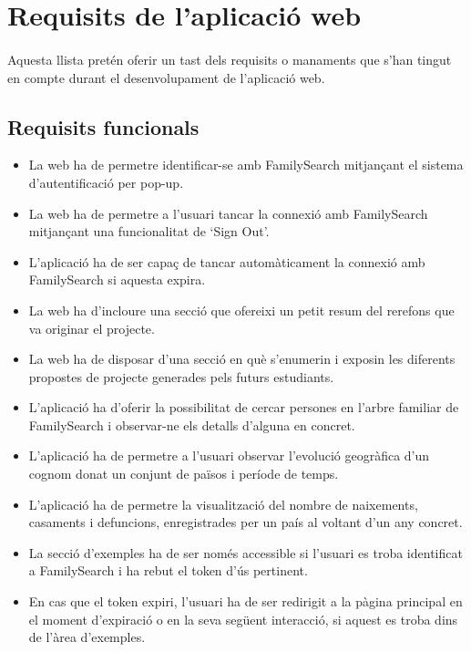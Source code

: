 \section{Requisits de l'aplicació web}

    \paragraph{}
    Aquesta llista pretén oferir un tast dels requisits o manaments que s'han tingut en compte durant el desenvolupament de l'aplicació web.

    \subsection{Requisits funcionals}

    \begin{itemize}
        \item La web ha de permetre identificar-se amb FamilySearch mitjançant el sistema d'autentificació per pop-up.
        \item La web ha de permetre a l'usuari tancar la connexió amb FamilySearch mitjançant una funcionalitat de `Sign Out'.
        \item L'aplicació ha de ser capaç de tancar automàticament la connexió amb Family\-Search si aquesta expira.
        \item La web ha d'incloure una secció que ofereixi un petit resum del rerefons que va originar el projecte.
        \item La web ha de disposar d'una secció en què s'enumerin i exposin les diferents propostes de projecte generades pels futurs estudiants.
        \item L'aplicació ha d'oferir la possibilitat de cercar persones en l'arbre familiar de FamilySearch i observar-ne els detalls d'alguna en concret.
        \item L'aplicació ha de permetre a l'usuari observar l'evolució geogràfica d'un cognom donat un conjunt de països i període de temps.
        \item L'aplicació ha de permetre la visualització del nombre de naixements, casaments i defuncions, enregistrades per un país al voltant d'un any concret.
        \item La secció d'exemples ha de ser només accessible si l'usuari es troba identificat a FamilySearch i ha rebut el token d'ús pertinent.
        \item En cas que el token expiri, l'usuari ha de ser redirigit a la pàgina principal en el moment d'expiració o en la seva següent interacció, si aquest es troba dins de l'àrea d'exemples.

\end{itemize}
